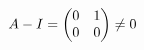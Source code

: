 \documentclass[preview]{standalone}
\begin{document}
\begin{align*}
\special{dvisvgm:raw <g id='unique000'>}A-I=\begin{pmatrix}0&1\\0&0\end{pmatrix}\ne 0\special{dvisvgm:raw </g>}
\end{align*}
\end{document}
